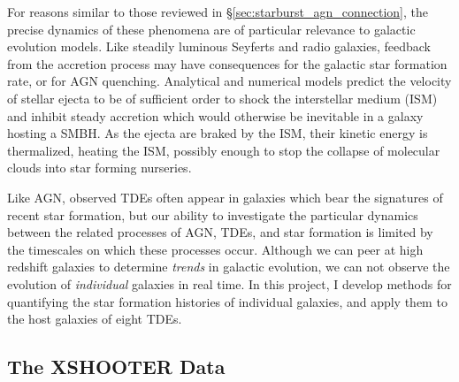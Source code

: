 \documentclass[a4paper,11pt]{article}
\begin{document}
For reasons similar to those reviewed in \S\ref{sec:starburst_agn_connection}, the precise dynamics of these phenomena are of particular relevance to galactic evolution models. Like steadily luminous Seyferts and radio galaxies, feedback from the accretion process may have consequences for the galactic star formation rate, or for AGN quenching. Analytical and numerical models predict the velocity of stellar ejecta to be of sufficient order to shock the interstellar medium (ISM) and inhibit steady accretion which would otherwise be inevitable in a galaxy hosting a SMBH.\cite{Evans_1989} As the ejecta are braked by the ISM, their kinetic energy is thermalized, heating the ISM, possibly enough to stop the collapse of molecular  clouds into star forming nurseries.\cite{Rees_1988}

Like AGN, observed TDEs often appear in galaxies which bear the signatures of recent star formation, but our ability to investigate the particular dynamics between the related processes of AGN, TDEs, and star formation is limited by the timescales on which these processes occur. Although we can peer at high redshift galaxies to determine \textit{trends} in galactic evolution, we can not observe the evolution of \textit{individual} galaxies in real time. In this project, I develop methods for quantifying the star formation histories of individual galaxies, and apply them to the host galaxies of eight TDEs.

\subsection{The XSHOOTER Data}\label{sec:xshooter_data}
\end{document}
